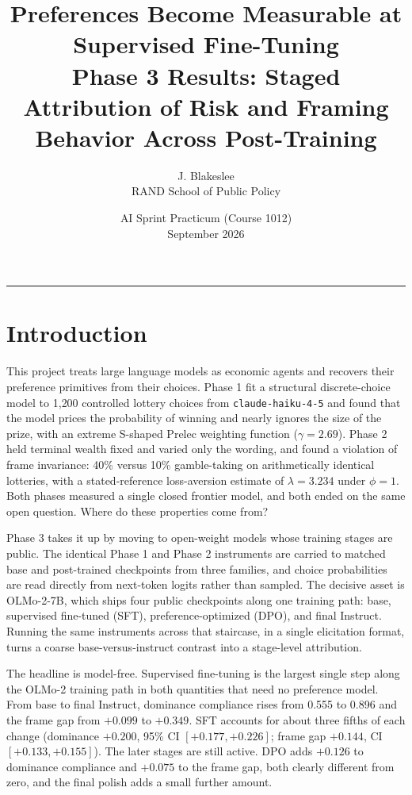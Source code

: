 \documentclass[11pt]{article}
\title{\vspace{-1.5em}\textbf{Preferences Become Measurable at Supervised Fine-Tuning}\\[0.3em]
\large Phase 3 Results: Staged Attribution of Risk and Framing Behavior Across Post-Training}
\author{J. Blakeslee \\ \small RAND School of Public Policy}
\date{\small AI Sprint Practicum (Course 1012) \\ \small September 2026}
\begin{document}
\maketitle

\hrule
\vspace{0.5em}

\section{Introduction}

This project treats large language models as economic agents and recovers their preference
primitives from their choices. Phase 1 fit a structural discrete-choice model to 1{,}200 controlled
lottery choices from \texttt{claude-haiku-4-5} and found that the model prices the probability of
winning and nearly ignores the size of the prize, with an extreme S-shaped Prelec weighting function
($\gamma = 2.69$). Phase 2 held terminal wealth fixed and varied only the wording, and found a
violation of frame invariance: 40\% versus 10\% gamble-taking on arithmetically identical lotteries,
with a stated-reference loss-aversion estimate of $\lambda = 3.234$ under $\phi = 1$. Both phases
measured a single closed frontier model, and both ended on the same open question. Where do these
properties come from?

Phase 3 takes it up by moving to open-weight models whose training stages are public. The identical
Phase 1 and Phase 2 instruments are carried to matched base and post-trained checkpoints from three
families, and choice probabilities are read directly from next-token logits rather than sampled.
The decisive asset is OLMo-2-7B, which ships four public checkpoints along one training path: base,
supervised fine-tuned (SFT), preference-optimized (DPO), and final Instruct. Running the same
instruments across that staircase, in a single elicitation format, turns a coarse base-versus-instruct
contrast into a stage-level attribution.

The headline is model-free. Supervised fine-tuning is the largest single step along the OLMo-2
training path in both quantities that need no preference model. From base to final Instruct, dominance
compliance rises from 0.555 to 0.896 and the frame gap from $+0.099$ to $+0.349$. SFT accounts for about
three fifths of each change (dominance $+0.200$, 95\% CI $[+0.177, +0.226]$; frame gap $+0.144$, CI
$[+0.133, +0.155]$). The later stages are still active. DPO adds $+0.126$ to dominance compliance and
$+0.075$ to the frame gap, both clearly different from zero, and the final polish adds a small further
amount.
\end{document}
